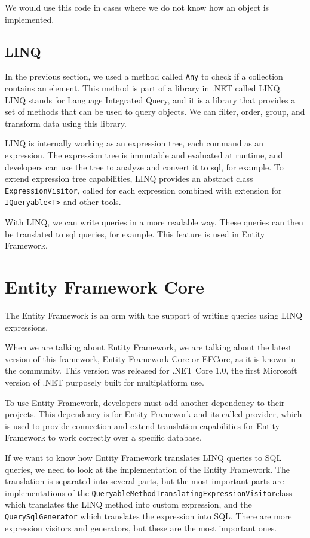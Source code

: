 We would use this code in cases where we do not know how an object is implemented.

\subsection {LINQ}

In the previous section, we used a method called \texttt{Any} to check if a collection contains an element. This method is part of a library in .NET called LINQ.
LINQ stands for Language Integrated Query, and it is a library that provides a set of methods that can be used to query objects.
We can filter, order, group, and transform data using this library.

LINQ is internally working as an expression tree, each command as an expression. The expression tree is immutable and evaluated at runtime, and developers
can use the tree to analyze and convert it to \acrshort{sql}, for example. To extend expression tree capabilities, LINQ provides an abstract class \texttt{ExpressionVisitor},
called for each expression combined with extension for \texttt{IQueryable<T>} and other tools.


With LINQ, we can write queries in a more readable way. These queries can then be translated to \acrshort{sql} queries, for example.
This feature is used in Entity Framework.

\section {Entity Framework Core}

The Entity Framework is an \acrshort{orm} with the support of writing queries using LINQ expressions.

When we are talking about Entity Framework, we are talking about the latest version of this framework, Entity Framework Core or EFCore, as it is known in the community.
This version was released for .NET Core 1.0, the first Microsoft version of .NET purposely built for multiplatform use.

To use Entity Framework, developers must add another dependency to their projects. This dependency is for Entity Framework and its called provider, which is used
to provide connection and extend translation capabilities for Entity Framework to work correctly over a specific database.

If we want to know how Entity Framework translates LINQ queries to SQL queries, we need to look at the implementation of the Entity Framework.
The translation is separated into several parts, but the most important parts are implementations of the \texttt{QueryableMethodTranslatingExpressionVisitor}\linebreak class which translates the LINQ method into custom expression, and the \texttt{QuerySqlGenerator} which translates the expression into SQL.
There are more expression visitors and generators, but these are the most important ones.

